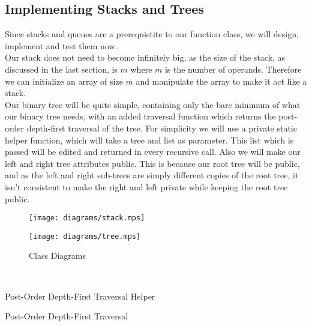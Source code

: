\documentclass[../../../../../main.tex]{subfiles}
\begin{document}
\subsection{Implementing Stacks and Trees}
Since stacks and queues are a prerequistite to our function class, we will design, implement and test them now.\\
Our stack does not need to become infinitely big, as the size of the stack, as discussed in the last section, is $m$ where $m$ is the number of operands. Therefore we can initialize an array of size $m$ and manipulate the array to make it act like a stack.\\
Our binary tree will be quite simple, containing only the bare minimum of what our binary tree needs, with an added traversal function which returns the post-order depth-first traversal of the tree. For simplicity we will use a private static helper function, which will take a tree and list as parameter. This list which is passed will be edited and returned in every recursive call. Also we will make our left and right tree attributes public. This is because our root tree will be public, and as the left and right sub-trees are simply different copies of the root tree, it isn't consistent to make the right and left private while keeping the root tree public.\\
\begin{figure}[h]
\centering
\begin{minipage}{.5\textwidth}
  \centering
  \texttt{[image: diagrams/stack.mps]}
\end{minipage}%
\begin{minipage}{.5\textwidth}
  \centering
  \texttt{[image: diagrams/tree.mps]}
\end{minipage}

\caption{Class Diagrams}
\end{figure}
\\
\begin{algorithm}[H]
\caption{Post-Order Depth-First Traversal Helper}
\DontPrintSemicolon
{}
\end{algorithm}
\begin{algorithm}[H]
\caption{Post-Order Depth-First Traversal}
\DontPrintSemicolon
{}
\end{algorithm}

\newpage
\end{document}
